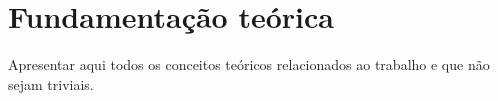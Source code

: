 \chapter{Fundamentação teórica} \label{chap:fundamentacao}

Apresentar aqui todos os conceitos teóricos relacionados ao trabalho e que não sejam triviais.
